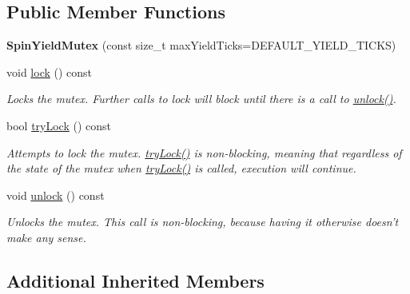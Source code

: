 \subsection*{Public Member Functions}
\begin{DoxyCompactItemize}
\item 
\hypertarget{class_d_x_1_1_spin_yield_mutex_a039edcf6c2266ace07dfa648f9a45f78}{{\bfseries Spin\-Yield\-Mutex} (const size\-\_\-t max\-Yield\-Ticks=D\-E\-F\-A\-U\-L\-T\-\_\-\-Y\-I\-E\-L\-D\-\_\-\-T\-I\-C\-K\-S)}\label{class_d_x_1_1_spin_yield_mutex_a039edcf6c2266ace07dfa648f9a45f78}

\item 
void \hyperlink{class_d_x_1_1_spin_yield_mutex_ad2229f4e9acd7c6bab9e2fbe029b1f1f}{lock} () const 
\begin{DoxyCompactList}\small\item\em Locks the mutex. Further calls to lock will block until there is a call to \hyperlink{class_d_x_1_1_spin_yield_mutex_a89bd23cc61dc3029baf5b2c14f834dfc}{unlock()}. \end{DoxyCompactList}\item 
bool \hyperlink{class_d_x_1_1_spin_yield_mutex_acd1ed560cf8afd7363a520beff4b5455}{try\-Lock} () const 
\begin{DoxyCompactList}\small\item\em Attempts to lock the mutex. \hyperlink{class_d_x_1_1_spin_yield_mutex_acd1ed560cf8afd7363a520beff4b5455}{try\-Lock()} is non-\/blocking, meaning that regardless of the state of the mutex when \hyperlink{class_d_x_1_1_spin_yield_mutex_acd1ed560cf8afd7363a520beff4b5455}{try\-Lock()} is called, execution will continue. \end{DoxyCompactList}\item 
\hypertarget{class_d_x_1_1_spin_yield_mutex_a89bd23cc61dc3029baf5b2c14f834dfc}{void \hyperlink{class_d_x_1_1_spin_yield_mutex_a89bd23cc61dc3029baf5b2c14f834dfc}{unlock} () const }\label{class_d_x_1_1_spin_yield_mutex_a89bd23cc61dc3029baf5b2c14f834dfc}

\begin{DoxyCompactList}\small\item\em Unlocks the mutex. This call is non-\/blocking, because having it otherwise doesn't make any sense. \end{DoxyCompactList}\end{DoxyCompactItemize}
\subsection*{Additional Inherited Members}


